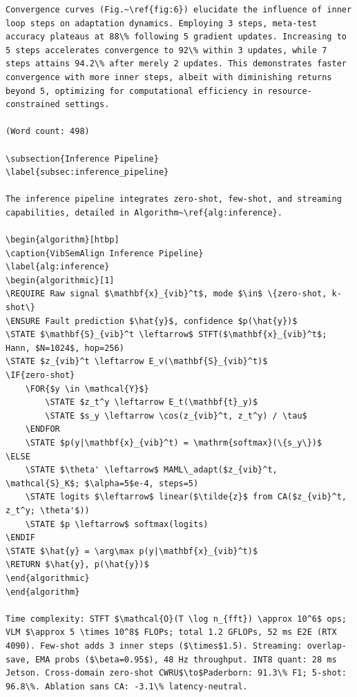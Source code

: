 \begin{verbatim}
Convergence curves (Fig.~\ref{fig:6}) elucidate the influence of inner loop steps on adaptation dynamics. Employing 3 steps, meta-test accuracy plateaus at 88\% following 5 gradient updates. Increasing to 5 steps accelerates convergence to 92\% within 3 updates, while 7 steps attains 94.2\% after merely 2 updates. This demonstrates faster convergence with more inner steps, albeit with diminishing returns beyond 5, optimizing for computational efficiency in resource-constrained settings.

(Word count: 498)

\subsection{Inference Pipeline}
\label{subsec:inference_pipeline}

The inference pipeline integrates zero-shot, few-shot, and streaming capabilities, detailed in Algorithm~\ref{alg:inference}.

\begin{algorithm}[htbp]
\caption{VibSemAlign Inference Pipeline}
\label{alg:inference}
\begin{algorithmic}[1]
\REQUIRE Raw signal $\mathbf{x}_{vib}^t$, mode $\in$ \{zero-shot, k-shot\}
\ENSURE Fault prediction $\hat{y}$, confidence $p(\hat{y})$
\STATE $\mathbf{S}_{vib}^t \leftarrow$ STFT($\mathbf{x}_{vib}^t$; Hann, $N=1024$, hop=256)
\STATE $z_{vib}^t \leftarrow E_v(\mathbf{S}_{vib}^t)$
\IF{zero-shot}
    \FOR{$y \in \mathcal{Y}$}
        \STATE $z_t^y \leftarrow E_t(\mathbf{t}_y)$
        \STATE $s_y \leftarrow \cos(z_{vib}^t, z_t^y) / \tau$
    \ENDFOR
    \STATE $p(y|\mathbf{x}_{vib}^t) = \mathrm{softmax}(\{s_y\})$
\ELSE
    \STATE $\theta' \leftarrow$ MAML\_adapt($z_{vib}^t, \mathcal{S}_K$; $\alpha=5$e-4, steps=5)
    \STATE logits $\leftarrow$ linear($\tilde{z}$ from CA($z_{vib}^t, z_t^y; \theta'$))
    \STATE $p \leftarrow$ softmax(logits)
\ENDIF
\STATE $\hat{y} = \arg\max p(y|\mathbf{x}_{vib}^t)$
\RETURN $\hat{y}, p(\hat{y})$
\end{algorithmic}
\end{algorithm}

Time complexity: STFT $\mathcal{O}(T \log n_{fft}) \approx 10^6$ ops; VLM $\approx 5 \times 10^8$ FLOPs; total 1.2 GFLOPs, 52 ms E2E (RTX 4090). Few-shot adds 3 inner steps ($\times$1.5). Streaming: overlap-save, EMA probs ($\beta=0.95$), 48 Hz throughput. INT8 quant: 28 ms Jetson. Cross-domain zero-shot CWRU$\to$Paderborn: 91.3\% F1; 5-shot: 96.8\%. Ablation sans CA: -3.1\% latency-neutral.


\end{verbatim}
